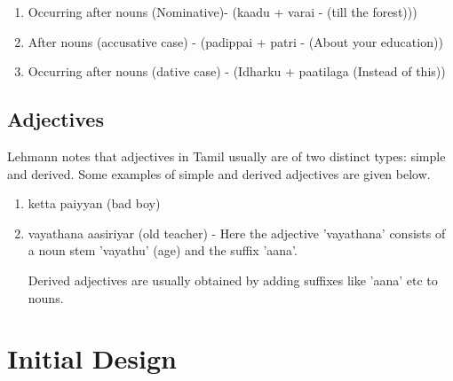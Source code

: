 \documentclass[11pt,letterpaper]{article}
\begin{document}
\begin{enumerate}
 \item Occurring after nouns (Nominative)- (kaadu + varai - (till the forest)))
 \item After nouns (accusative case) - (padippai + patri - (About your education))
 \item Occurring after nouns (dative case) - (Idharku + paatilaga (Instead of this))
 
\end{enumerate}

\subsection{Adjectives}
Lehmann notes that adjectives in Tamil usually are of two distinct types: simple and derived. Some examples of simple
and derived adjectives are given below.

\begin{enumerate}
 \item ketta paiyyan (bad boy)
 \item vayathana aasiriyar (old teacher) - Here the adjective 'vayathana' consists of a noun stem 'vayathu' (age) and the suffix
 'aana'. 
 
Derived adjectives are usually obtained by adding suffixes like 'aana' etc to nouns.
\end{enumerate}
 
\section{Initial Design}
\end{document}
